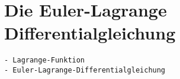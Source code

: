 %
%
%
\section{Die Euler-Lagrange Differentialgleichung
\label{buch:variation:section:eulerlagrange}}

\begin{verbatim}
- Lagrange-Funktion
- Euler-Lagrange-Differentialgleichung
\end{verbatim}
